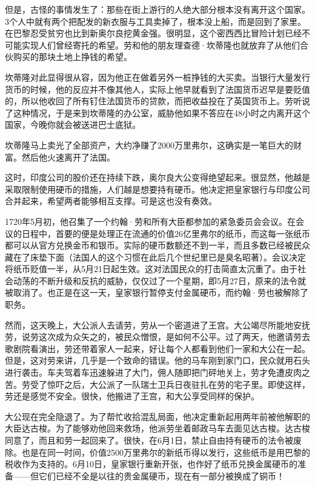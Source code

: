 \documentclass[12pt,oneside]{book}
\begin{document}
但是，古怪的事情发生了：那些在街上游行的人绝大部分根本没有离开这个国家。3个人中就有两个把配发的新衣服与工具卖掉了，根本没上船，而是回到了家里。在巴黎忍受贫穷也比到新奥尔良挖黄金强。很明显，这个密西西比冒险计划已经不可能实现人们曾经寄托的希望。劳和他的朋友理查德·坎蒂隆也就放弃了从他们合伙购买的那块土地上挣钱的希望。

坎蒂隆对此显得很从容，因为他正在做着另外一桩挣钱的大买卖。当银行大量发行货币的时候，他的反应并不像其他人，实际上他早就看到了法国货币迟早是要贬值的，所以他收回了所有钉住法国货币的贷款，而把收益投在了英国货币上。劳听说了这种情况，于是来到坎蒂隆的办公室，威胁他如果不答应在48小时之内离开这个国家，今晚你就会被送进巴士底狱。

坎蒂隆马上卖光了全部资产，大约净赚了2000万里弗尔，这确实是一笔巨大的财富。然后他火速离开了法国。

这时，印度公司的股价还在持续下跌，奥尔良大公变得绝望起来。很显然，他越是采取限制使用硬币的措施，人们越是想要持有硬币。他决定把皇家银行与印度公司合并起来，希望两者能够相互支撑。可是这也没有奏效。

1720年5月初，他召集了一个约翰·劳和所有大臣都参加的紧急委员会会议。在会议的日程中，首要的便是处理正在流通的价值26亿里弗尔的纸币，而这每一张纸币都可以从官方兑换金币和银币。实际的硬币数额还不到一半，而且多数已经被民众藏在了床垫下面（法国人的这个习惯在此后几个世纪里已是臭名昭著）。会议决定将纸币贬值一半，从5月21日起生效。这对法国民众的打击简直太沉重了。由于社会动荡的不断升级和反抗的威胁，仅仅过了一个星期，即5月27日，原来的法令就被取消了。也正是在这一天，皇家银行暂停支付金属硬币，而约翰·劳也被解除了职务。

然而，这天晚上，大公派人去请劳，劳从一个密道进了王宫。大公竭尽所能地安抚劳，说劳这次成为众矢之的，被民众憎恨，是如何不公平。过了两天，他邀请劳去歌剧院看演出，劳还带着家人一起来，好让每个人都看到他们一家和大公在一起。但是，这对劳来讲，几乎是一个致命的错误。他的马车刚到家门口，民众就用石头进行袭击。车夫驾着车迅速躲进了大门，佣人随即把门砰地关上，劳才免遭皮肉之苦。劳受了惊吓之后，大公派了一队瑞士卫兵日夜驻扎在劳的宅子里。即使这样，劳还是感觉不安全。很快，他搬进了王宫，和大公享受同样的保护。

大公现在完全隐退了。为了帮忙收拾混乱局面，他决定重新起用两年前被他解职的大臣达古梭。为了能够劝他回来救场，他派劳坐着邮政马车去面见达古梭。达古梭同意了，而且和劳一起回来了。很快，在6月1日，禁止自由持有硬币的法令被废除。也是在同一时间，价值2500万里弗尔的新纸币得以发行，这些纸币是用巴黎的税收作为支持的。6月10日，皇家银行重新开张，也作好了纸币兑换金属硬币的准备——但它们已经不全是以往的贵金属硬币，现在有一部分被换成了铜币！
\end{document}
